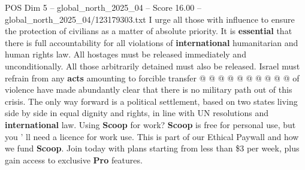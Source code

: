 \begin{textsample}{POS Dim 5 – global\_north\_2025\_04 – Score 16.00 – global\_north\_2025\_04/123179303.txt}
I urge all those with influence to ensure the protection of civilians as a matter of absolute priority.
It is \textbf{essential} that there is full accountability for all violations of \textbf{international} humanitarian and human rights law.
All hostages must be released immediately and unconditionally.
All those arbitrarily detained must also be released.
Israel must refrain from any \textbf{acts} amounting to forcible transfer @ @ @ @ @ @ @ @ @ @ of violence have made abundantly clear that there is no military path out of this crisis.
The only way forward is a political settlement, based on two states living side by side in equal dignity and rights, in line with UN resolutions and \textbf{international} law.
Using \textbf{Scoop} for work? \textbf{Scoop} is free for personal use, but you ' ll need a licence for work use.
This is part of our Ethical Paywall and how we fund \textbf{Scoop}.
Join today with plans starting from less than \$3 per week, plus gain access to exclusive \textbf{Pro} features.

\end{textsample}
